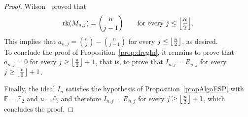\documentclass[11pt]{article}
\newcommand{\F}[0]{\mathbb{F}}
\DeclarePairedDelimiter{\fl}{\lfloor}{\rfloor}
\theoremstyle{plain}
\theoremstyle{definition}
\theoremstyle{remark}
\begin{document}
\begin{proof}
Wilson~\cite[Lemma 1]{WILSON1990609} proved that \begin{equation*}
    \operatorname{rk}(M_{n,j})=\binom{n}{j-1}\qquad\text{for every }j\leq\fl*{\frac{n}{2}}.
\end{equation*} 
This implies that $a_{n,j}=\binom{n}{j}-\binom{n}{j-1}$ for every $j\leq\fl*{\frac{n}{2}}$, as desired.\\

To conclude the proof of Proposition~\ref{prop:dregIn}, it remains to prove that $a_{n,j}=0$ for every $j\geq\fl*{\frac{n}{2}}+1$, that is, to prove that $I_{n,j}=R_{n,j}$ for every $j\geq\fl*{\frac{n}{2}}+1$.

Finally, the ideal $I_n$ satisfies the hypothesis of Proposition~\ref{propAlgoESP} with $\F=\F_2$ and $u=0$, and therefore $I_{n,j}=R_{n,j}$ for every $j\geq\fl*{\frac{n}{2}}+1$, which concludes the proof.
\end{proof}
\end{document}
